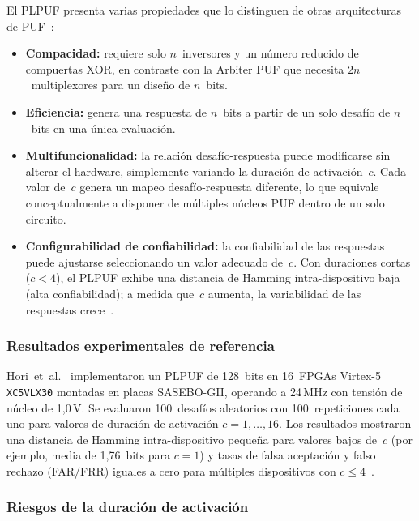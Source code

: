 El PLPUF presenta varias propiedades que lo distinguen de otras arquitecturas
de PUF~\cite{hori_2011_pseudolfsr}:

\begin{itemize}
  \item \textbf{Compacidad:} requiere solo $n$~inversores y un número
    reducido de compuertas XOR, en contraste con la Arbiter PUF que necesita
    $2n$~multiplexores para un diseño de $n$~bits.
  \item \textbf{Eficiencia:} genera una respuesta de $n$~bits a partir de un
    solo desafío de $n$~bits en una única evaluación.
  \item \textbf{Multifuncionalidad:} la relación desafío-respuesta puede
    modificarse sin alterar el hardware, simplemente variando la duración de
    activación~$c$. Cada valor de~$c$ genera un mapeo desafío-respuesta
    diferente, lo que equivale conceptualmente a disponer de múltiples
    núcleos PUF dentro de un solo circuito.
  \item \textbf{Configurabilidad de confiabilidad:} la confiabilidad de las
    respuestas puede ajustarse seleccionando un valor adecuado de~$c$. Con
    duraciones cortas ($c < 4$), el PLPUF exhibe una distancia de Hamming
    intra-dispositivo baja (alta confiabilidad); a medida que~$c$ aumenta, la
    variabilidad de las respuestas crece~\cite{hori_2011_pseudolfsr}.
\end{itemize}

\subsubsection{Resultados experimentales de referencia}

Hori~et~al.~\cite{hori_2011_pseudolfsr} implementaron un PLPUF de 128~bits
en 16~FPGAs Virtex-5 \texttt{XC5VLX30} montadas en placas SASEBO-GII,
operando a 24\,MHz con tensión de núcleo de 1,0\,V. Se evaluaron 100~desafíos
aleatorios con 100~repeticiones cada uno para valores de duración de
activación $c = 1, \ldots, 16$. Los resultados mostraron una distancia de
Hamming intra-dispositivo pequeña para valores bajos de~$c$ (por ejemplo,
media de 1,76~bits para $c = 1$) y tasas de falsa aceptación y falso rechazo
(FAR/FRR) iguales a cero para múltiples dispositivos con
$c \leq 4$~\cite{hori_2011_pseudolfsr}.

\subsubsection{Riesgos de la duración de activación}

